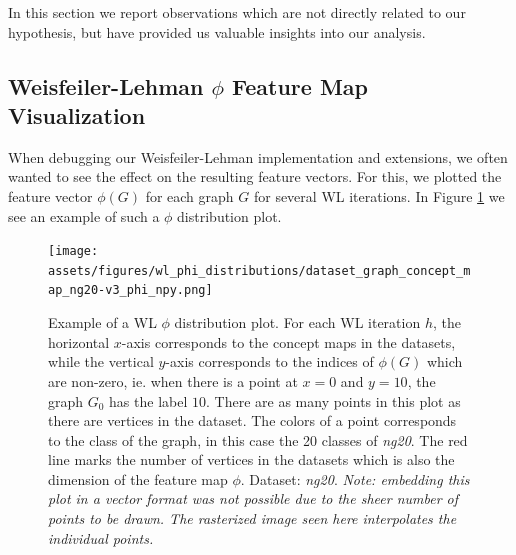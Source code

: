 In this section we report observations which are not directly related to our hypothesis, but have provided us valuable insights into our analysis.

\subsection{Weisfeiler-Lehman $\phi$ Feature Map Visualization}
When debugging our Weisfeiler-Lehman implementation and extensions, we often wanted to see the effect on the resulting feature vectors.
For this, we plotted the feature vector $\phi(G)$ for each graph $G$ for several WL iterations.
In Figure \ref{fig:phi_distribution_example} we see an example of such a $\phi$ distribution plot.

\begin{figure}[htb!]
	\centering
	{\texttt{[image: assets/figures/wl\_phi\_distributions/dataset\_graph\_concept\_map\_ng20-v3\_phi\_npy.png]}
		\caption[Example: $\phi$ distribution plot]{%
			Example of a WL $\phi$ distribution plot.
			For each WL iteration $h$, the horizontal $x$-axis corresponds to the concept maps in the datasets, while the vertical $y$-axis corresponds to the indices of $\phi(G)$ which are non-zero, ie. when there is a point at $x=0$ and $y=10$, the graph $G_0$ has the label $10$.
			There are as many points in this plot as there are vertices in the dataset.
			The colors of a point corresponds to the class of the graph, in this case the 20 classes of \textit{ng20}.
			The red line marks the number of vertices in the datasets which is also the dimension of the feature map $\phi$.
			Dataset: \textit{ng20}.
			\textit{Note: embedding this plot in a vector format  was not possible due to the sheer number of points to be drawn. The rasterized image seen here interpolates the individual points.}
		}%
		\label{fig:phi_distribution_example}}
\end{figure}

